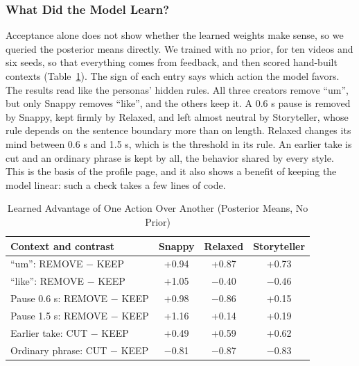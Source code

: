 \documentclass{ieeeaccess}
\begin{document}
\subsubsection{What Did the Model Learn?}
Acceptance alone does not show whether the learned weights make sense, so we queried the posterior means directly. We trained with no prior, for ten videos and six seeds, so that everything comes from feedback, and then scored hand-built contexts (Table~\ref{tab:learned}). The sign of each entry says which action the model favors. The results read like the personas' hidden rules. All three creators remove ``um'', but only Snappy removes ``like'', and the others keep it. A 0.6 s pause is removed by Snappy, kept firmly by Relaxed, and left almost neutral by Storyteller, whose rule depends on the sentence boundary more than on length. Relaxed changes its mind between 0.6 s and 1.5 s, which is the threshold in its rule. An earlier take is cut and an ordinary phrase is kept by all, the behavior shared by every style. This is the basis of the profile page, and it also shows a benefit of keeping the model linear: such a check takes a few lines of code.

\begin{table}[t]
\caption{Learned Advantage of One Action Over Another (Posterior Means, No Prior)}
\label{tab:learned}
\setlength{\tabcolsep}{3pt}
\centering
\begin{tabular}{|l|c|c|c|}
\hline
Context and contrast & Snappy & Relaxed & Storyteller \\
\hline
``um'': REMOVE $-$ KEEP & +0.94 & +0.87 & +0.73 \\
``like'': REMOVE $-$ KEEP & +1.05 & $-$0.40 & $-$0.46 \\
Pause 0.6 s: REMOVE $-$ KEEP & +0.98 & $-$0.86 & +0.15 \\
Pause 1.5 s: REMOVE $-$ KEEP & +1.16 & +0.14 & +0.19 \\
Earlier take: CUT $-$ KEEP & +0.49 & +0.59 & +0.62 \\
Ordinary phrase: CUT $-$ KEEP & $-$0.81 & $-$0.87 & $-$0.83 \\
\hline
\end{tabular}
\end{table}
\end{document}
